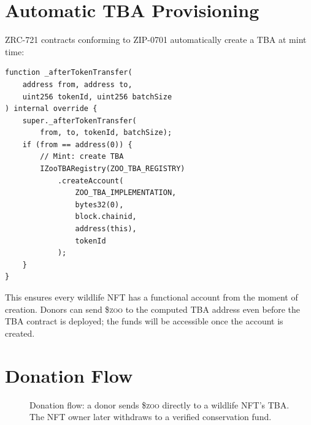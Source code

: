 \documentclass[11pt,letterpaper]{article}
\newcommand{\ZOO}{\$\textsc{zoo}}
\begin{document}
\section{Automatic TBA Provisioning}

ZRC-721 contracts conforming to ZIP-0701 automatically create a TBA at mint time:

\begin{lstlisting}[language=Solidity,caption=Automatic TBA creation on mint]
function _afterTokenTransfer(
    address from, address to,
    uint256 tokenId, uint256 batchSize
) internal override {
    super._afterTokenTransfer(
        from, to, tokenId, batchSize);
    if (from == address(0)) {
        // Mint: create TBA
        IZooTBARegistry(ZOO_TBA_REGISTRY)
            .createAccount(
                ZOO_TBA_IMPLEMENTATION,
                bytes32(0),
                block.chainid,
                address(this),
                tokenId
            );
    }
}
\end{lstlisting}

This ensures every wildlife NFT has a functional account from the moment of creation. Donors can send \ZOO{} to the computed TBA address even before the TBA contract is deployed; the funds will be accessible once the account is created.

\section{Donation Flow}
\label{sec:donation}

\begin{figure}[t]
\centering
{}
\caption{Donation flow: a donor sends \ZOO{} directly to a wildlife NFT's TBA. The NFT owner later withdraws to a verified conservation fund.}
\label{fig:donation}
\end{figure}
\end{document}
